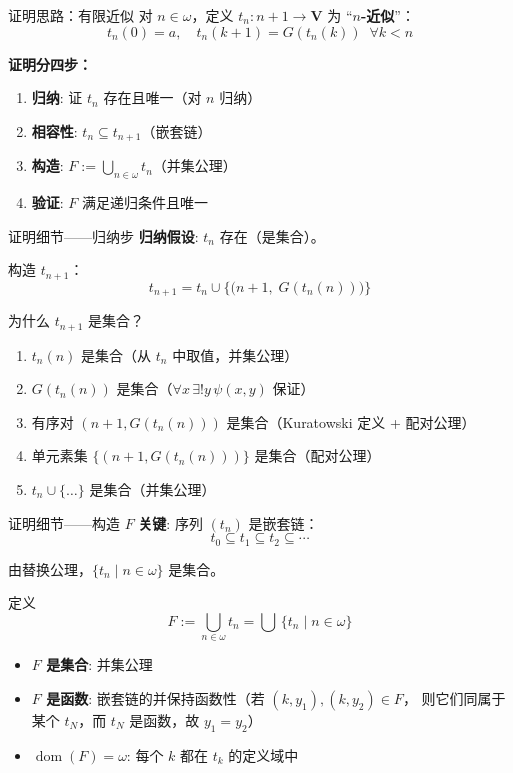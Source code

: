 \documentclass[10pt,aspectratio=169]{beamer}
\newcommand{\VV}{\mathbf{V}}
\DeclareMathOperator{\dom}{dom}
\begin{document}
\begin{frame}{证明思路：有限近似}
  对 $n \in \omega$，定义 $t_n: n+1 \to \VV$ 为 ``$n$\textbf{-近似}''：
  \[
    t_n(0) = a, \quad t_n(k+1) = G(t_n(k)) \;\; \forall k < n
  \]

  \medskip
  \textbf{证明分四步：}

  \medskip
  \begin{enumerate}
    \item \textbf{归纳}: 证 $t_n$ 存在且唯一（对 $n$ 归纳）
    \item \textbf{相容性}: $t_n \subseteq t_{n+1}$（嵌套链）
    \item \textbf{构造}: $F := \bigcup_{n \in \omega} t_n$（并集公理）
    \item \textbf{验证}: $F$ 满足递归条件且唯一
  \end{enumerate}
\end{frame}

\begin{frame}{证明细节——归纳步}
  \textbf{归纳假设}: $t_n$ 存在（是集合）。

  \medskip
  构造 $t_{n+1}$：
  \[
    t_{n+1} = t_n \cup \bigl\{\bigl(n+1,\; G(t_n(n))\bigr)\bigr\}
  \]

  \medskip
  为什么 $t_{n+1}$ 是集合？
  \begin{enumerate}
    \item $t_n(n)$ 是集合（从 $t_n$ 中取值，并集公理）
    \item $G(t_n(n))$ 是集合（$\forall x\, \exists! y\, \psi(x,y)$ 保证）
    \item 有序对 $(n+1, G(t_n(n)))$ 是集合（Kuratowski 定义 + 配对公理）
    \item 单元素集 $\{(n+1, G(t_n(n)))\}$ 是集合（配对公理）
    \item $t_n \cup \{\ldots\}$ 是集合（并集公理）
  \end{enumerate}
\end{frame}

\begin{frame}{证明细节——构造 $F$}
  \textbf{关键}: 序列 $(t_n)$ 是嵌套链：
  \[
    t_0 \subseteq t_1 \subseteq t_2 \subseteq \cdots
  \]

  \medskip
  由替换公理，$\{t_n \mid n \in \omega\}$ 是集合。

  定义
  \[
    F := \bigcup_{n \in \omega} t_n = \bigcup\, \{t_n \mid n \in \omega\}
  \]

  \begin{itemize}
    \item \textbf{$F$ 是集合}: 并集公理
    \item \textbf{$F$ 是函数}: 嵌套链的并保持函数性（若 $(k, y_1), (k, y_2) \in F$，
          则它们同属于某个 $t_N$，而 $t_N$ 是函数，故 $y_1 = y_2$）
    \item \textbf{$\dom(F) = \omega$}: 每个 $k$ 都在 $t_k$ 的定义域中
  \end{itemize}
\end{frame}
\end{document}
